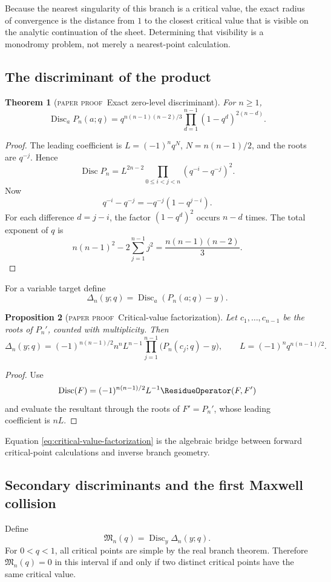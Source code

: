 \documentclass[11pt,oneside]{article}
\newtheorem{theorem}{Theorem}[section]
\newtheorem{proposition}[theorem]{Proposition}
\theoremstyle{definition}
\theoremstyle{remark}
\theoremstyle{plain}
\theoremstyle{definition}
\theoremstyle{remark}
\newcommand{\Disc}{\operatorname{Disc}}
\newcommand{\statusproved}{\textcolor{provedgreen}{\textsc{paper proof}}}
\numberwithin{equation}{section}
\numberwithin{figure}{section}
\numberwithin{table}{section}
\let\reportsubsection\subsection
\let\reportsubsubsection\subsubsection
\let\section\reportsubsection
\let\subsection\reportsubsubsection
\begin{document}
Because the nearest singularity of this branch is a critical value, the exact
radius of convergence is the distance from \(1\) to the closest critical value
that is visible on the analytic continuation of the sheet.  Determining that
visibility is a monodromy problem, not merely a nearest-point calculation.

\section{The discriminant of the product}
\begin{theorem}[\statusproved\ Exact zero-level discriminant]
For \(n\ge1\),
\begin{equation}
 \Disc_a P_n(a;q)
 =q^{n(n-1)(n-2)/3}
 \prod_{d=1}^{n-1}(1-q^d)^{2(n-d)}.
 \label{eq:finite-poch-disc}
\end{equation}
\end{theorem}
\begin{proof}
The leading coefficient is
\(L=(-1)^nq^{N}\), \(N=n(n-1)/2\), and the roots are \(q^{-j}\).  Hence
\[
 \Disc P_n=L^{2n-2}\prod_{0\le i<j<n}(q^{-i}-q^{-j})^2.
\]
Now
\[
 q^{-i}-q^{-j}=-q^{-j}(1-q^{j-i}).
\]
For each difference \(d=j-i\), the factor \((1-q^d)^2\) occurs \(n-d\)
times.  The total exponent of \(q\) is
\[
 n(n-1)^2-2\sum_{j=1}^{n-1}j^2
 =\frac{n(n-1)(n-2)}3.
\]
\end{proof}

For a variable target define
\[
 \Delta_n(y;q)=\Disc_a(P_n(a;q)-y).
\]

\begin{proposition}[\statusproved\ Critical-value factorization]
Let \(c_1,\ldots,c_{n-1}\) be the roots of \(P_n'\), counted with
multiplicity.  Then
\begin{equation}
 \Delta_n(y;q)=(-1)^{n(n-1)/2}n^nL^{n-1}
 \prod_{j=1}^{n-1}\bigl(P_n(c_j;q)-y\bigr),
 \qquad L=(-1)^nq^{n(n-1)/2}.
 \label{eq:critical-value-factorization}
\end{equation}
\end{proposition}
\begin{proof}
Use
\[
 \Disc(F)=(-1)^{n(n-1)/2}L^{-1}\ResidueOperator(F,F')
\]
and evaluate the resultant through the roots of \(F'=P_n'\), whose leading
coefficient is \(nL\).
\end{proof}

Equation \eqref{eq:critical-value-factorization} is the algebraic bridge between
forward critical-point calculations and inverse branch geometry.

\section{Secondary discriminants and the first Maxwell collision}
Define
\[
 \mathfrak M_n(q)=\Disc_y\Delta_n(y;q).
\]
For \(0<q<1\), all critical points are simple by the real branch theorem.
Therefore \(\mathfrak M_n(q)=0\) in this interval if and only if two distinct
critical points have the same critical value.
\end{document}
